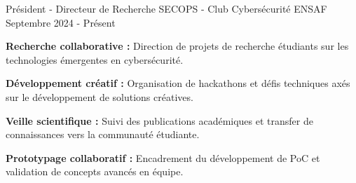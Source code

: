 
\begin{cventries}

    \cventry
    {Président - Directeur de Recherche} %
    {SECOPS - Club Cybersécurité} %
    {ENSAF} %
    {Septembre 2024 - Présent} %
    {
        \begin{cvitems} %
            \item {\textbf{Recherche collaborative :} Direction de projets de recherche étudiants sur les technologies émergentes en cybersécurité.}
            \item {\textbf{Développement créatif :} Organisation de hackathons et défis techniques axés sur le développement de solutions créatives.}
            \item {\textbf{Veille scientifique :} Suivi des publications académiques et transfer de connaissances vers la communauté étudiante.}
            \item {\textbf{Prototypage collaboratif :} Encadrement du développement de PoC et validation de concepts avancés en équipe.}
        \end{cvitems}
    }

\end{cventries}